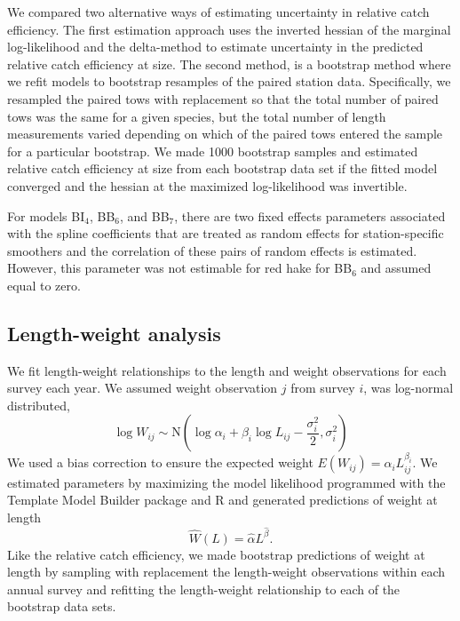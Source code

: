 \documentclass[
  12pt,
]{article}
\begin{document}
We compared two alternative ways of estimating uncertainty in relative
catch efficiency. The first estimation approach uses the inverted
hessian of the marginal log-likelihood and the delta-method to estimate
uncertainty in the predicted relative catch efficiency at size. The
second method, is a bootstrap method where we refit models to bootstrap
resamples of the paired station data. Specifically, we resampled the
paired tows with replacement so that the total number of paired tows was
the same for a given species, but the total number of length
measurements varied depending on which of the paired tows entered the
sample for a particular bootstrap. We made 1000 bootstrap samples and
estimated relative catch efficiency at size from each bootstrap data set
if the fitted model converged and the hessian at the maximized
log-likelihood was invertible.

For models BI\(_4\), BB\(_6\), and BB\(_7\), there are two fixed effects
parameters associated with the spline coefficients that are treated as
random effects for station-specific smoothers and the correlation of
these pairs of random effects is estimated. However, this parameter was
not estimable for red hake for BB\(_6\) and assumed equal to zero.

\hypertarget{length-weight-analysis}{%
\subsection{Length-weight analysis}\label{length-weight-analysis}}

We fit length-weight relationships to the length and weight observations
for each survey each year. We assumed weight observation \(j\) from
survey \(i\), was log-normal distributed, \begin{equation}\label{wal}
 \log W_{ij} \sim \text{N}\left(\log \alpha_i + \beta_i \log L_{ij} - \frac{\sigma_i^2}{2}, \sigma_i^2\right)
\end{equation} We used a bias correction to ensure the expected weight
\(E(W_{ij})= \alpha_i L_{ij}^{\beta_i}\). We estimated parameters by
maximizing the model likelihood programmed with the Template Model
Builder package \citep{kristensenetal16} and R \citep{R19} and generated
predictions of weight at length \begin{equation}\label{predwal}
\widehat W(L) = \widehat \alpha L^{\widehat \beta}.
\end{equation} Like the relative catch efficiency, we made bootstrap
predictions of weight at length by sampling with replacement the
length-weight observations within each annual survey and refitting the
length-weight relationship to each of the bootstrap data sets.
\end{document}
